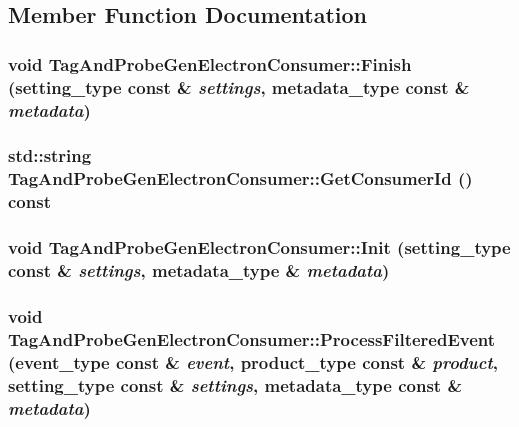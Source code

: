 \subsection{Member Function Documentation}
\hypertarget{classTagAndProbeGenElectronConsumer_a509528ca82b59b3f304ed4c825ad7c0f}{
\subsubsection[{Finish}]{\setlength{\rightskip}{0pt plus 5cm}void TagAndProbeGenElectronConsumer::Finish (setting\_\-type const \& {\em settings}, \/  metadata\_\-type const \& {\em metadata})}}
\label{classTagAndProbeGenElectronConsumer_a509528ca82b59b3f304ed4c825ad7c0f}
\hypertarget{classTagAndProbeGenElectronConsumer_aae06db426822e38f8c7cf3486197fe8a}{
\subsubsection[{GetConsumerId}]{\setlength{\rightskip}{0pt plus 5cm}std::string TagAndProbeGenElectronConsumer::GetConsumerId () const}}
\label{classTagAndProbeGenElectronConsumer_aae06db426822e38f8c7cf3486197fe8a}
\hypertarget{classTagAndProbeGenElectronConsumer_abd8376fc9db6ea7c2fd16e7f476f48c2}{
\subsubsection[{Init}]{\setlength{\rightskip}{0pt plus 5cm}void TagAndProbeGenElectronConsumer::Init (setting\_\-type const \& {\em settings}, \/  metadata\_\-type \& {\em metadata})}}
\label{classTagAndProbeGenElectronConsumer_abd8376fc9db6ea7c2fd16e7f476f48c2}
\hypertarget{classTagAndProbeGenElectronConsumer_a90114e5dd42f7674d18d94aa0cdf37c5}{
\subsubsection[{ProcessFilteredEvent}]{\setlength{\rightskip}{0pt plus 5cm}void TagAndProbeGenElectronConsumer::ProcessFilteredEvent (event\_\-type const \& {\em event}, \/  product\_\-type const \& {\em product}, \/  setting\_\-type const \& {\em settings}, \/  metadata\_\-type const \& {\em metadata})}}
